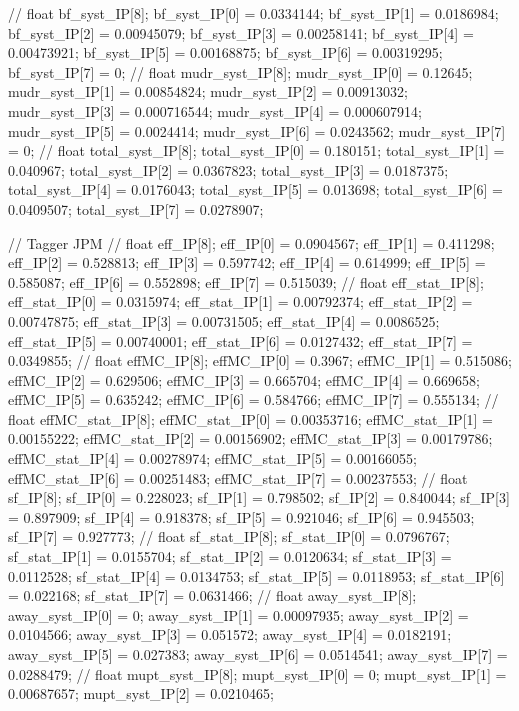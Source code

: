 // float bf_syst_IP[8];
bf_syst_IP[0] = 0.0334144; bf_syst_IP[1] = 0.0186984; bf_syst_IP[2] = 0.00945079; 
bf_syst_IP[3] = 0.00258141; bf_syst_IP[4] = 0.00473921; bf_syst_IP[5] = 0.00168875; 
bf_syst_IP[6] = 0.00319295; bf_syst_IP[7] = 0; 
// float mudr_syst_IP[8];
mudr_syst_IP[0] = 0.12645; mudr_syst_IP[1] = 0.00854824; mudr_syst_IP[2] = 0.00913032; 
mudr_syst_IP[3] = 0.000716544; mudr_syst_IP[4] = 0.000607914; mudr_syst_IP[5] = 0.0024414; 
mudr_syst_IP[6] = 0.0243562; mudr_syst_IP[7] = 0; 
// float total_syst_IP[8];
total_syst_IP[0] = 0.180151; total_syst_IP[1] = 0.040967; total_syst_IP[2] = 0.0367823; 
total_syst_IP[3] = 0.0187375; total_syst_IP[4] = 0.0176043; total_syst_IP[5] = 0.013698; 
total_syst_IP[6] = 0.0409507; total_syst_IP[7] = 0.0278907; 



// Tagger JPM
// float eff_IP[8];
eff_IP[0] = 0.0904567; eff_IP[1] = 0.411298; eff_IP[2] = 0.528813; 
eff_IP[3] = 0.597742; eff_IP[4] = 0.614999; eff_IP[5] = 0.585087; 
eff_IP[6] = 0.552898; eff_IP[7] = 0.515039; 
// float eff_stat_IP[8];
eff_stat_IP[0] = 0.0315974; eff_stat_IP[1] = 0.00792374; eff_stat_IP[2] = 0.00747875; 
eff_stat_IP[3] = 0.00731505; eff_stat_IP[4] = 0.0086525; eff_stat_IP[5] = 0.00740001; 
eff_stat_IP[6] = 0.0127432; eff_stat_IP[7] = 0.0349855; 
// float effMC_IP[8];
effMC_IP[0] = 0.3967; effMC_IP[1] = 0.515086; effMC_IP[2] = 0.629506; 
effMC_IP[3] = 0.665704; effMC_IP[4] = 0.669658; effMC_IP[5] = 0.635242; 
effMC_IP[6] = 0.584766; effMC_IP[7] = 0.555134; 
// float effMC_stat_IP[8];
effMC_stat_IP[0] = 0.00353716; effMC_stat_IP[1] = 0.00155222; effMC_stat_IP[2] = 0.00156902; 
effMC_stat_IP[3] = 0.00179786; effMC_stat_IP[4] = 0.00278974; effMC_stat_IP[5] = 0.00166055; 
effMC_stat_IP[6] = 0.00251483; effMC_stat_IP[7] = 0.00237553; 
// float sf_IP[8];
sf_IP[0] = 0.228023; sf_IP[1] = 0.798502; sf_IP[2] = 0.840044; 
sf_IP[3] = 0.897909; sf_IP[4] = 0.918378; sf_IP[5] = 0.921046; 
sf_IP[6] = 0.945503; sf_IP[7] = 0.927773; 
// float sf_stat_IP[8];
sf_stat_IP[0] = 0.0796767; sf_stat_IP[1] = 0.0155704; sf_stat_IP[2] = 0.0120634; 
sf_stat_IP[3] = 0.0112528; sf_stat_IP[4] = 0.0134753; sf_stat_IP[5] = 0.0118953; 
sf_stat_IP[6] = 0.022168; sf_stat_IP[7] = 0.0631466; 
// float away_syst_IP[8];
away_syst_IP[0] = 0; away_syst_IP[1] = 0.00097935; away_syst_IP[2] = 0.0104566; 
away_syst_IP[3] = 0.051572; away_syst_IP[4] = 0.0182191; away_syst_IP[5] = 0.027383; 
away_syst_IP[6] = 0.0514541; away_syst_IP[7] = 0.0288479; 
// float mupt_syst_IP[8];
mupt_syst_IP[0] = 0; mupt_syst_IP[1] = 0.00687657; mupt_syst_IP[2] = 0.0210465; 
